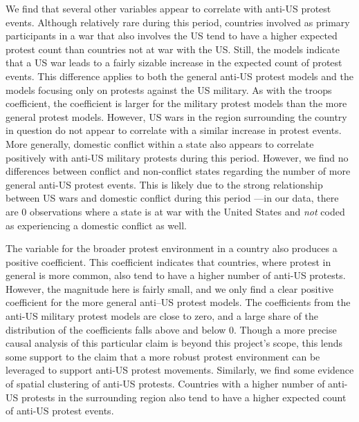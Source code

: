 			
			We find that several other variables appear to correlate with anti-US protest events. Although relatively rare during this period, countries involved as primary participants in a war that also involves the US tend to have a higher expected protest count than countries not at war with the US.\cite[Note that we use the countries listed in the PRIO/UCDP data's ``gw\_loc'' field. This lists the countries central to the incompatibility at the center of the conflict. This is a slightly broader way to group countries than looking only at countries where the US has invaded, but narrower than including all countries who participate in broad military operations like the ones we see in Afghanistan and Iraq.][]{Gleditschetal2002,Pettersson2019} Still, the models indicate that a US war leads to a fairly sizable increase in the expected count of protest events. This difference applies to both the general anti-US protest models and the models focusing only on protests against the US military. As with the troops coefficient, the coefficient is larger for the military protest models than the more general protest models. However, US wars in the region surrounding the country in question do not appear to correlate with a similar increase in protest events. More generally, domestic conflict within a state also appears to correlate positively with anti-US military protests during this period. However, we find no differences between conflict and non-conflict states regarding the number of more general anti-US protest events. This is likely due to the strong relationship between US wars and domestic conflict during this period ---in our data, there are 0 observations where a state is at war with the United States and \textit{not} coded as experiencing a domestic conflict as well. 
			
			The variable for the broader protest environment in a country also produces a positive coefficient. This coefficient indicates that countries, where protest in general is more common, also tend to have a higher number of anti-US protests. However, the magnitude here is fairly small, and we only find a clear positive coefficient for the more general anti--US protest models. The coefficients from the anti-US military protest models are close to zero, and a large share of the distribution of the coefficients falls above and below 0. Though a more precise causal analysis of this particular claim is beyond this project's scope, this lends some support to the claim that a more robust protest environment can be leveraged to support anti-US protest movements. Similarly, we find some evidence of spatial clustering of anti-US protests. Countries with a higher number of anti-US protests in the surrounding region also tend to have a higher expected count of anti-US protest events.
			
